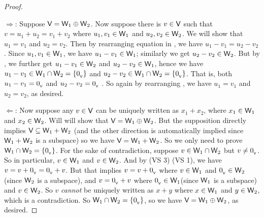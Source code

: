 \begin{proof}\ 

\(\Longrightarrow\): Suppose \(\textsf{V} = \textsf{W}_1 \oplus \textsf{W}_2\).
Now suppose there is \(v \in \textsf{V}\) such that \(v = u_1 + u_2 = v_1 + v_2\)  where \(u_1, v_1 \in \textsf{W}_1\) and \(u_2, v_2 \in \textsf{W}_2\).
We will show that \(u_1 = v_1\) and \(u_2 = v_2\).
Then by rearranging equation in , we have \(u_1 - v_1 = u_2 - v_2\) .
Since \(u_1, v_1 \in \textsf{W}_1\), we have \(u_1 - v_1 \in \textsf{W}_1\); similarly we get \(u_2 - v_2 \in \textsf{W}_2\).
But by , we further get \(u_1 - v_1 \in \textsf{W}_2\) and \(u_2 - v_2 \in \textsf{W}_1\), hence we have \(u_1 - v_1 \in \textsf{W}_1 \cap \textsf{W}_2 = \{ 0_{_{\textsf{V}}} \}\) and \(u_2 - v_2 \in \textsf{W}_1 \cap \textsf{W}_2 = \{ 0_{_{\textsf{V}}} \}\).
That is, both \(u_1 - v_1 = 0_{_{\textsf{V}}}\) and \(u_2 - v_2 = 0_{_{\textsf{V}}}\) .
So again by rearranging , we have \(u_1 = v_1\) and \(u_2 = v_2\), as desired.

\(\Longleftarrow\): Now suppose any \(v \in \textsf{V}\) can be uniquely written as \(x_1 + x_2\), where \(x_1 \in \textsf{W}_1\) and \(x_2 \in \textsf{W}_2\).
Will will show that \(\textsf{V} = \textsf{W}_1 \oplus \textsf{W}_2\).
But the supposition directly implies \(\textsf{V} \subseteq \textsf{W}_1 + \textsf{W}_2\) (and the other direction is automatically implied since \(\textsf{W}_1 + \textsf{W}_2\) is a subspace) so we have \(\textsf{V} = \textsf{W}_1 + \textsf{W}_2\).
So we only need to prove \(\textsf{W}_1 \cap \textsf{W}_2 = \{ 0_{_{\textsf{V}}} \}\).
For the sake of contradiction, suppose \(v \in \textsf{W}_1 \cap \textsf{W}_2\) but \(v \ne 0_{_{\textsf{V}}}\).
So in particular, \(v \in \textsf{W}_1\) and \(v \in \textsf{W}_2\).
And by (VS 3) (VS 1), we have \(v = v + 0_{_{\textsf{V}}} = 0_{_{\textsf{V}}} + v\).
But that implies \(v = v + 0_{_{\textsf{V}}}\) where \(v \in \textsf{W}_1\) and \(0_{_{\textsf{V}}} \in \textsf{W}_2\)(since \(\textsf{W}_2\) is a subspace), and \(v = 0_{_{\textsf{V}}} + v\) where \(0_{_{\textsf{V}}} \in \textsf{W}_1\)(since \(\textsf{W}_1\) is a subspace) and \(v \in \textsf{W}_2\).
So \(v\) \emph{cannot} be uniquely written as \(x + y\) where \(x \in \textsf{W}_1\) and \(y \in \textsf{W}_2\), which is a contradiction.
So \(\textsf{W}_1 \cap \textsf{W}_2 = \{ 0_{_{\textsf{V}}} \}\), so we have \(\textsf{V} = \textsf{W}_1 \oplus \textsf{W}_2\), as desired.
\end{proof}

